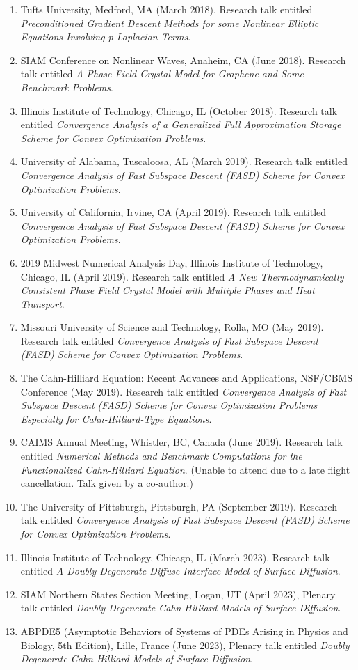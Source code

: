 \documentclass[10pt,letterpaper]{article}
\begin{document}
\begin{enumerate}
	\item
Tufts University, Medford, MA (March 2018).  Research talk entitled {\sl Preconditioned Gradient Descent Methods for some Nonlinear Elliptic Equations Involving p-Laplacian Terms}.
	\item
SIAM Conference on Nonlinear Waves, Anaheim, CA (June 2018). Research talk entitled {\sl A Phase Field Crystal Model for Graphene and Some Benchmark Problems}.
	\item
Illinois Institute of Technology, Chicago, IL (October 2018).  Research talk entitled {\sl Convergence Analysis of a Generalized Full Approximation Storage Scheme for Convex Optimization Problems}.
	\item
University of Alabama, Tuscaloosa, AL (March 2019).  Research talk entitled {\sl Convergence Analysis of Fast Subspace Descent (FASD) Scheme for Convex Optimization Problems}.
	\item
University of California, Irvine, CA (April 2019).  Research talk entitled {\sl Convergence Analysis of Fast Subspace Descent (FASD) Scheme for Convex Optimization Problems}.
	\item
2019 Midwest Numerical Analysis Day, Illinois Institute of Technology, Chicago, IL (April 2019).  Research talk entitled {\sl A New Thermodynamically Consistent Phase Field Crystal Model with Multiple Phases and Heat Transport}.
	\item
Missouri University of Science and Technology, Rolla, MO (May 2019).  Research talk entitled {\sl Convergence Analysis of Fast Subspace Descent (FASD) Scheme for Convex Optimization Problems}.
	\item
The Cahn-Hilliard Equation: Recent Advances and Applications, NSF/CBMS Conference (May 2019). Research talk entitled {\sl Convergence Analysis of Fast Subspace Descent (FASD) Scheme for Convex Optimization Problems Especially for Cahn-Hilliard-Type Equations}.
	\item
CAIMS Annual Meeting, Whistler, BC, Canada (June 2019). Research talk entitled {\sl Numerical Methods and Benchmark Computations for the Functionalized Cahn-Hilliard Equation}. (Unable to attend due to a late flight cancellation. Talk given by a co-author.)
	\item
The University of Pittsburgh, Pittsburgh, PA (September 2019).  Research talk entitled {\sl Convergence Analysis of Fast Subspace Descent (FASD) Scheme for Convex Optimization Problems}.
	\item
Illinois Institute of Technology, Chicago, IL (March 2023). Research talk entitled {\sl A Doubly Degenerate Diffuse-Interface Model of Surface Diffusion}.
	\item
SIAM Northern States Section Meeting, Logan, UT (April 2023), Plenary talk entitled {\sl Doubly Degenerate Cahn-Hilliard Models of Surface Diffusion}.
	\item
ABPDE5 (Asymptotic Behaviors of Systems of PDEs Arising in Physics and Biology, 5th Edition), Lille, France (June 2023), Plenary talk entitled {\sl Doubly Degenerate Cahn-Hilliard Models of Surface Diffusion}.


\end{enumerate}
\end{document}
